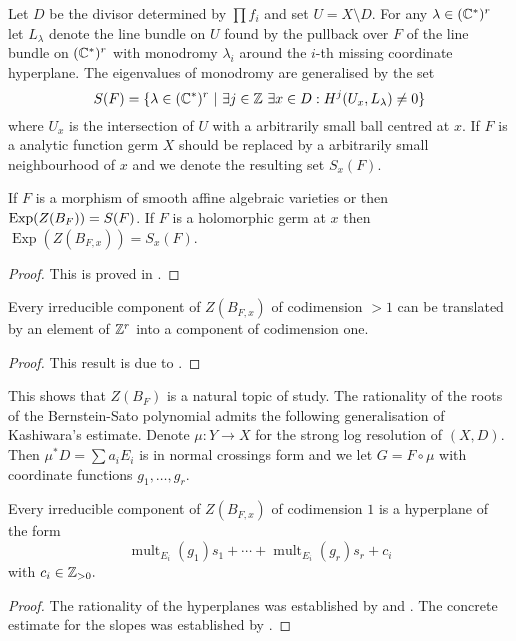 Let $D$ be the divisor determined by $\prod f_i$ and set $U= X\setminus D$.
For any $\lambda \in (\mathbb{C}^*)^r$ let $L_\lambda$ denote the line bundle on $U$ found by the pullback over $F$ of the line bundle on $(\mathbb{C}^*)^r$ with monodromy $\lambda_i$ around the $i$-th missing coordinate hyperplane.
The eigenvalues of monodromy are generalised by the set
$$S(F) = \{\lambda \in (\mathbb{C}^*)^r \ \vert\  \exists j\in \mathbb{Z}\  \exists x\in D: H^j(U_x,L_\lambda) \neq 0\} $$
where $U_x$ is the intersection of $U$ with a arbitrarily small ball centred at $x$.
If $F$ is a analytic function germ $X$ should be replaced by a arbitrarily small neighbourhood of $x$ and we denote the resulting set $S_x(F)$.
\begin{theorem}
  If $F$ is a morphism of smooth affine algebraic varieties or then $\operatorname{Exp}(Z(B_F)) = S(F)$. If $F$ is a holomorphic germ at $x$ then $\operatorname{Exp}(Z(B_{F,x})) = S_x(F)$.
\end{theorem}
\begin{proof}
  This is proved in \cite{budur2019zero}.
\end{proof}
\begin{theorem}
  Every irreducible component of $Z(B_{F,x})$ of codimension $>1$ can be translated by an element of $\mathbb{Z}^r$ into a component of codimension one.
\end{theorem}
\begin{proof}
  This result is due to \cite{maisonobe2016filtration}.
\end{proof}
This shows that $Z(B_{F})$ is a natural topic of study.
The rationality of the roots of the Bernstein-Sato polynomial admits the following generalisation of Kashiwara's estimate.
Denote $\mu:Y\to X$ for the strong log resolution of $(X,D)$.
Then $\mu^*D = \sum a_i E_i$ is in normal crossings form and we let $G = F\circ \mu$ with coordinate functions $g_1,\ldots, g_r$.
\begin{theorem}
  Every irreducible component of $Z(B_{F,x})$ of codimension $1$ is a hyperplane of the form
  $$\operatorname{mult}_{E_i}(g_1) s_1 + \cdots + \operatorname{mult}_{E_i}(g_r)s_r + c_i $$
  with $c_i\in \mathbb{Z}_{>0}.$
\end{theorem}
\begin{proof}
  The rationality of the hyperplanes was established by \cite{sabbah1987proximite} and \cite{gyoja1993bernstein}.
  The concrete estimate for the slopes was established by \cite{budur2019zero}.
\end{proof}

